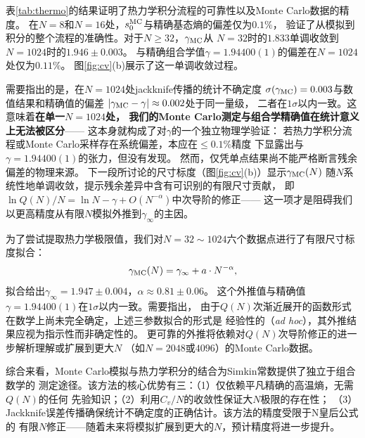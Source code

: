 表\ref{tab:thermo}的结果证明了热力学积分流程的可靠性以及Monte Carlo数据的精度。
在$N=8$和$N=16$处，$s_{0}^{\rm MC}$与精确基态熵的偏差仅为$0.1\%$，
验证了从模拟到积分的整个流程的准确性。对于$N\ge32$，$\gamma_{\rm MC}$从
$N=32$时的$1.833$单调收敛到$N=1024$时的$1.946\pm0.003$。
与精确组合学值$\gamma=1.94400(1)$的偏差在$N=1024$处仅为$0.11\%$。
图\ref{fig:cv}(b)展示了这一单调收敛过程。

需要指出的是，在$N=1024$处jackknife传播的统计不确定度
$\sigma(\gamma_{\rm MC})=0.003$与数值结果和精确值的偏差
$|\gamma_{\rm MC}-\gamma|\approx0.002$处于同一量级，
二者在$1\sigma$以内一致。这意味着\textbf{在单一$N=1024$处，
我们的Monte Carlo测定与组合学精确值在统计意义上无法被区分}——
这本身就构成了对$\gamma$的一个独立物理学验证：
若热力学积分流程或Monte Carlo采样存在系统偏差，本应在$\le0.1\%$精度
下显露出与$\gamma=1.94400(1)$的张力，但没有发现。
然而，仅凭单点结果尚不能严格断言残余偏差的物理来源。
下一段所讨论的尺寸标度（图\ref{fig:cv}(b)）显示$\gamma_{\rm MC}(N)$
随$N$系统性地单调收敛，提示残余差异中含有可识别的有限尺寸贡献，
即$\ln Q(N)/N=\ln N-\gamma+O(N^{-\alpha})$中次导阶的修正——
这一项才是阻碍我们以更高精度从有限$N$模拟外推到$\gamma_{\infty}$的主因。

为了尝试提取热力学极限值，我们对$N=32\sim1024$六个数据点进行了有限尺寸标度拟合：
%
\begin{equation}
  \gamma_{\rm MC}(N) = \gamma_{\infty} + a\cdot N^{-\alpha},
\end{equation}
%
拟合给出$\gamma_{\infty}=1.947\pm0.004$，$\alpha\approx0.81\pm0.06$。
这个外推值与精确值$\gamma=1.94400(1)$在$1\sigma$以内一致。需要指出，
由于$Q(N)$次渐近展开的函数形式在数学上尚未完全确定，上述三参数拟合的形式是
经验性的（\textit{ad hoc}），其外推结果应视为指示性而非确定性的。
更可靠的外推将依赖对$Q(N)$次导阶修正的进一步解析理解或扩展到更大$N$
（如$N=2048$或$4096$）的Monte Carlo数据。

综合来看，Monte Carlo模拟与热力学积分的结合为Simkin常数提供了独立于组合数学的
测定途径。该方法的核心优势有三：（1）仅依赖平凡精确的高温熵，无需$Q(N)$的任何
先验知识；（2）利用$C_{v}/N$的收敛性保证大$N$极限的存在性；
（3）Jackknife误差传播确保统计不确定度的正确估计。该方法的精度受限于N皇后公式的
有限$N$修正——随着未来将模拟扩展到更大的$N$，预计精度将进一步提升。
